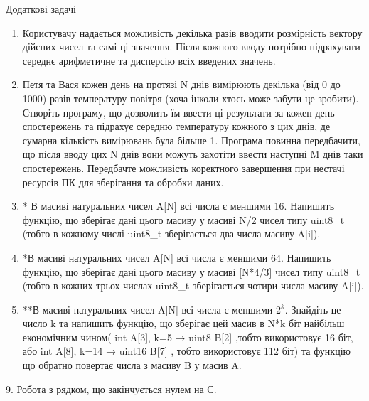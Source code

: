 \documentclass[]{article}
\makeatletter
\newcommand{\xslalph}[1]{\expandafter\@xslalph\csname c@#1\endcsname}
\newcommand{\@xslalph}[1]{%
    \ifcase#1\or а\or б\or в\or г\or д\or e\or є\or ж\or з\or i%
    \or й\or к\or л\or м\or н\or о\or п\or р\or с\or т%
    \or у\or ф\or х\or ц\or ч\or ш\or ю\or я\or аа\or бб\or вв%
    \else\@ctrerr\fi%
}
\makeatother
\begin{document}
\begin{enumerate}
\begin{enumerate}[label=\xslalph*)]
\begin{enumerate}
\begin{enumerate}[label=\xslalph*)]
\begin{enumerate}
\end{enumerate}

Додаткові задачі

\begin{enumerate}
\def\labelenumi{\arabic{enumi})}
\item
  Користувачу надається можливість декілька разів вводити розмірність
  вектору дійсних чисел та самі ці значення. Після кожного вводу
  потрібно підрахувати середнє арифметичне та дисперсію всіх введених
  значень.
\item
  Петя та Вася кожен день на протязі
  \protect\hypertarget{__DdeLink__55546_11145444801}{}{}N днів вимірюють
  декілька (від 0 до 1000) разів температуру повітря (хоча інколи хтось
  може забути це зробити). Створіть програму, що дозволить їм ввести ці
  результати за кожен день спостережень та підрахує середню температуру
  кожного з цих днів, де сумарна кількість вимірювань була більше 1.
  Програма повинна передбачити, що після вводу цих N днів вони можуть
  захотіти ввести наступні M днів таки спостережень. Передбачте
  можливість коректного завершення при нестачі ресурсів ПК для
  зберігання та обробки даних.
\item
  * В масиві натуральних чисел A{[}N{]} всі числа є меншими 16. Напишить
  функцію, що зберігає дані цього масиву у масиві N/2 чисел типу
  uint8\_t (тобто в кожному числі uint8\_t зберігається два числа масиву
  A{[}i{]}).
\item
  *В масиві натуральних чисел A{[}N{]} всі числа є меншими 64. Напишить
  функцію, що зберігає дані цього масиву у масиві {[}N*4/3{]} чисел типу
  uint8\_t (тобто в кожних трьох числах uint8\_t зберігається чотири
  числа масиву A{[}i{]}).
\item
  **В масиві натуральних чисел A{[}N{]} всі числа є меншими \(2^{k}\).
  Знайдіть це число k та напишить функцію, що зберігає цей масив в N*k
  біт найбільш економічним чином( int A{[}3{]}, k=5 → uint8 B{[}2{]}
  ,тобто використовує 16 біт, або int A{[}8{]}, k=14 → uint16 B{[}7{]} ,
  тобто використовує 112 біт) та функцію що обратно повертає числа з
  масиву B у масив A.
\end{enumerate}


9. Робота з рядком, що закінчується нулем на С.


\end{enumerate}
\end{enumerate}
\end{enumerate}
\end{enumerate}
\end{document}
